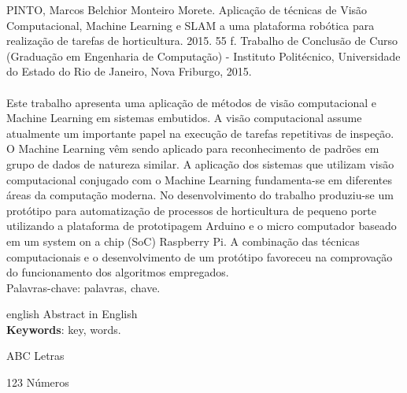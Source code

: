\documentclass[oneside,12pt]{abntex2}
\begin{document}
	\begin{resumo}[RESUMO]
	\vspace{\onelineskip}

		PINTO, Marcos Belchior Monteiro Morete. Aplicação de técnicas de Visão Computacional, Machine Learning e SLAM a uma plataforma robótica para realização de tarefas de horticultura.  2015. 55 f. Trabalho de Conclusão de Curso (Graduação em Engenharia de Computação) - Instituto Politécnico, Universidade do Estado do Rio de Janeiro, Nova Friburgo, 2015.\\
		
		\\\setlength{\parindent}{1cm}Este trabalho apresenta uma aplicação de métodos de visão computacional e Machine Learning em sistemas embutidos. A visão computacional assume atualmente um importante papel na execução de tarefas repetitivas de inspeção. O Machine Learning vêm sendo aplicado para reconhecimento de padrões em grupo de dados de natureza similar. A aplicação dos sistemas que utilizam visão computacional conjugado com o Machine Learning fundamenta-se  em diferentes áreas da computação moderna. No desenvolvimento do trabalho produziu-se um protótipo para automatização de processos de horticultura de pequeno porte utilizando a plataforma de prototipagem Arduino e o micro computador baseado em um system on a chip (SoC) Raspberry Pi. A combinação das técnicas computacionais e o desenvolvimento de um protótipo favoreceu na comprovação do funcionamento dos algoritmos empregados.		
		\vspace{\onelineskip}
		\\\noindent
		Palavras-chave: palavras, chave.
	\end{resumo}

	\begin{resumo}[Abstract]
		\begin{otherlanguage*}{english}
			Abstract in English
			\vspace{\onelineskip}
			\\\noindent
			\textbf{Keywords}: key, words.
		\end{otherlanguage*}
	\end{resumo}



	\begin{siglas}
		\item[ABC] Letras
		\item[123] Números
	\end{siglas}
\end{document}
